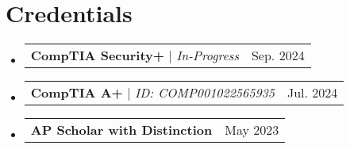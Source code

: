 \documentclass[letterpaper,11pt]{article}
\makeatletter
\newcommand{\resumeProjectHeading}[2]{
    \item
    \begin{tabular*}{0.97\textwidth}{l@{\extracolsep{\fill}}r}
      \small#1 & #2 \\
    \end{tabular*}\vspace{-7pt}
}
\newcommand{\resumeSubHeadingListStart}{\begin{itemize}[leftmargin=0.15in, label={}]}
\newcommand{\resumeSubHeadingListEnd}{\end{itemize}}
\makeatother
\begin{document}
\section{Credentials}
  \resumeSubHeadingListStart
    \resumeProjectHeading
      {\textbf{CompTIA Security+} $|$ \emph{In-Progress}}{Sep. 2024}
    \resumeProjectHeading
      {\textbf{CompTIA A+} $|$ \emph{ID: COMP001022565935}}{Jul. 2024}
    \resumeProjectHeading
      {\textbf{AP Scholar with Distinction}}{May 2023}
  \resumeSubHeadingListEnd



\end{document}
